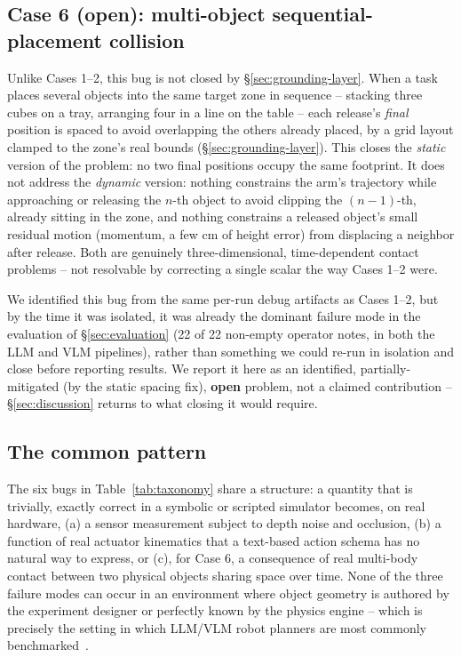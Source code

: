 \subsection{Case 6 (open): multi-object sequential-placement collision}
\label{sec:case-collision}

Unlike Cases 1--2, this bug is not closed by \S\ref{sec:grounding-layer}.
When a task places several objects into the same target zone in
sequence -- stacking three cubes on a tray, arranging four in a line on
the table -- each release's \emph{final} position is spaced to avoid
overlapping the others already placed, by a grid layout clamped to the
zone's real bounds (\S\ref{sec:grounding-layer}). This closes the
\emph{static} version of the problem: no two final positions occupy the
same footprint. It does not address the \emph{dynamic} version: nothing
constrains the arm's trajectory while approaching or releasing the
$n$-th object to avoid clipping the $(n-1)$-th, already sitting in the
zone, and nothing constrains a released object's small residual motion
(momentum, a few cm of height error) from displacing a neighbor after
release. Both are genuinely three-dimensional, time-dependent contact
problems -- not resolvable by correcting a single scalar the way Cases
1--2 were.

We identified this bug from the same per-run debug artifacts as Cases
1--2, but by the time it was isolated, it was already the dominant
failure mode in the evaluation of \S\ref{sec:evaluation} (22 of 22
non-empty operator notes, in both the LLM and VLM pipelines), rather
than something we could re-run in isolation and close before reporting
results. We report it here as an identified, partially-mitigated (by the
static spacing fix), \textbf{open} problem, not a claimed contribution --
\S\ref{sec:discussion} returns to what closing it would require.

\subsection{The common pattern}

The six bugs in Table~\ref{tab:taxonomy} share a structure: a quantity
that is trivially, exactly correct in a symbolic or scripted simulator
becomes, on real hardware, (a) a sensor measurement subject to depth
noise and occlusion, (b) a function of real actuator kinematics that a
text-based action schema has no natural way to express, or (c), for
Case 6, a consequence of real multi-body contact between two physical
objects sharing space over time. None of the three failure modes can
occur in an environment where object geometry is authored by the
experiment designer or perfectly known by the physics engine -- which is
precisely the setting in which LLM/VLM robot planners are most commonly
benchmarked~\cite{favaliRAS, favaliRoboReasonLab}.

